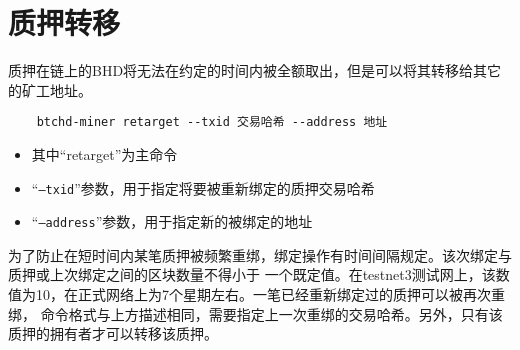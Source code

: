 \section{质押转移}
\begin{flushleft}
    质押在链上的BHD将无法在约定的时间内被全额取出，但是可以将其转移给其它的矿工地址。
\end{flushleft}
\scriptsize
\begin{verbatim}
    btchd-miner retarget --txid 交易哈希 --address 地址
\end{verbatim}
\normalsize
\begin{itemize}
    \item 其中``retarget''为主命令
    \item ``\texttt{--txid}''参数，用于指定将要被重新绑定的质押交易哈希
    \item ``\texttt{--address}''参数，用于指定新的被绑定的地址
\end{itemize}
\begin{flushleft}
    为了防止在短时间内某笔质押被频繁重绑，绑定操作有时间间隔规定。该次绑定与质押或上次绑定之间的区块数量不得小于
    一个既定值。在testnet3测试网上，该数值为10，在正式网络上为7个星期左右。一笔已经重新绑定过的质押可以被再次重绑，
    命令格式与上方描述相同，需要指定上一次重绑的交易哈希。另外，只有该质押的拥有者才可以转移该质押。
\end{flushleft}

